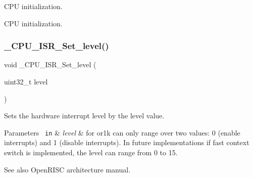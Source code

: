 C\+PU initialization. 

C\+PU initialization. \mbox{\label{group__RTEMSScoreCPUARM_ga43820ba3d51d7a699c22fce8cac93ef1}} 
\subsubsection{\texorpdfstring{\_CPU\_ISR\_Set\_level()}{\_CPU\_ISR\_Set\_level()}}
{\footnotesize\ttfamily void \+\_\+\+C\+P\+U\+\_\+\+I\+S\+R\+\_\+\+Set\+\_\+level (\begin{DoxyParamCaption}\item[{uint32\+\_\+t}]{level }\end{DoxyParamCaption})}



Sets the hardware interrupt level by the level value. 


\begin{DoxyParams}[1]{Parameters}
\mbox{\texttt{ in}}  & {\em level} & for or1k can only range over two values\+: 0 (enable interrupts) and 1 (disable interrupts). In future implementations if fast context switch is implemented, the level can range from 0 to 15. \\
\hline
\end{DoxyParams}
\begin{DoxySeeAlso}{See also}
Open\+R\+I\+SC architecture manual. 
\end{DoxySeeAlso}
